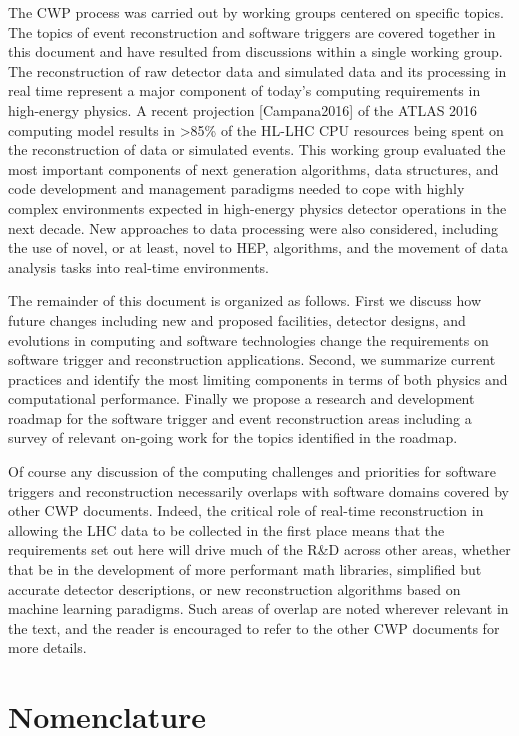 The CWP process was carried out by working groups centered on specific topics. The topics of event reconstruction and software triggers are covered together in this document and have resulted from discussions within a single working group. The reconstruction of raw detector data and simulated data and its processing in real time represent a major component of today's computing requirements in high-energy physics. A recent projection [Campana2016] of the ATLAS 2016 computing model results in >85\% of the HL-LHC CPU resources being spent on the reconstruction of data or simulated events. This working group evaluated the most important components of next generation algorithms, data structures, and code development and management paradigms needed to cope with highly complex environments expected in high-energy physics detector operations in the next decade. New approaches to data processing were also considered, including the use of novel, or at least, novel to HEP, algorithms, and the movement of data analysis tasks into real-time environments. 

The remainder of this document is organized as follows. First we discuss how future changes including new and proposed facilities, detector designs, and evolutions in computing and software technologies change the requirements on software trigger and reconstruction applications. Second, we summarize current practices and identify the most limiting components in terms of both physics and computational performance. Finally we propose a research and development roadmap for the software trigger and event reconstruction areas including a survey of relevant on-going work for the topics identified in the roadmap. 

Of course any discussion of the computing challenges and priorities for software triggers and reconstruction necessarily overlaps with software domains covered by other CWP documents. Indeed, the critical role of real-time reconstruction in allowing the LHC data to be collected in the first place means that the requirements set out here will drive much of the R\&D across other areas, whether that be in the development of more performant math libraries, simplified but accurate detector descriptions, or new reconstruction algorithms based on machine learning paradigms. Such areas of overlap are noted wherever relevant in the text, and the reader is encouraged to refer to the other CWP documents for more details.

\section{Nomenclature}

